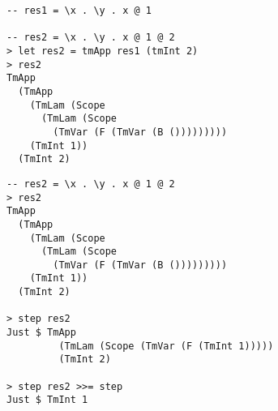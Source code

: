 \begin{frame}[fragile]
\begin{verbatim}
-- res1 = \x . \y . x @ 1

-- res2 = \x . \y . x @ 1 @ 2
> let res2 = tmApp res1 (tmInt 2)
> res2
TmApp 
  (TmApp 
    (TmLam (Scope 
      (TmLam (Scope 
        (TmVar (F (TmVar (B ())))))))) 
    (TmInt 1)) 
  (TmInt 2)
\end{verbatim}
\end{frame}

\begin{frame}[fragile]
\begin{verbatim}
-- res2 = \x . \y . x @ 1 @ 2
> res2
TmApp 
  (TmApp 
    (TmLam (Scope 
      (TmLam (Scope 
        (TmVar (F (TmVar (B ())))))))) 
    (TmInt 1)) 
  (TmInt 2)

> step res2
Just $ TmApp 
         (TmLam (Scope (TmVar (F (TmInt 1))))) 
         (TmInt 2)

> step res2 >>= step
Just $ TmInt 1
\end{verbatim}
\end{frame}